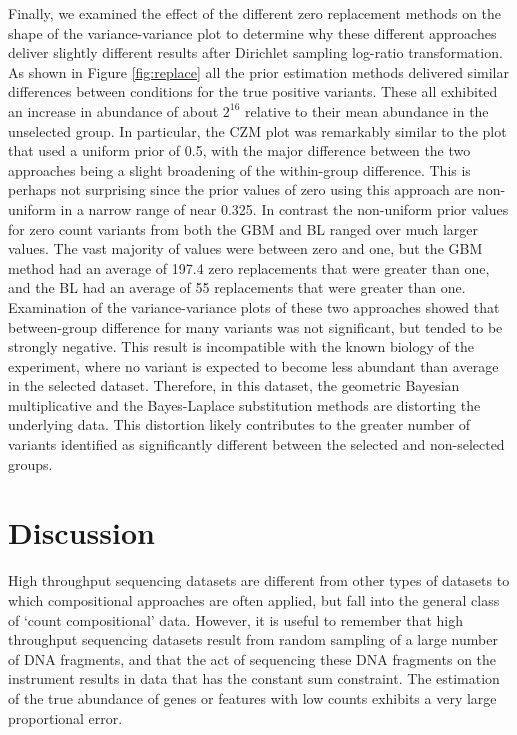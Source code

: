 \documentclass[article]{ajs}\usepackage[]{graphicx}\usepackage[]{color}
\begin{document}
Finally, we examined the effect of the different zero replacement methods on the shape of the variance-variance plot to determine why these different approaches deliver slightly different results after Dirichlet sampling log-ratio transformation. As shown in Figure \ref{fig:replace} all the prior estimation methods delivered similar differences between conditions for the true positive variants. These all exhibited an increase in abundance of about $2^{16}$ relative to their mean abundance in the unselected group. In particular, the CZM plot was remarkably similar  to the plot that used a uniform prior of 0.5, with the major difference between the two approaches being a slight broadening of the within-group difference. This is perhaps not surprising since the prior values of zero using this approach are non-uniform in a narrow range of near 0.325. In contrast the non-uniform prior values for zero count variants from both the GBM and BL ranged over much larger values. The vast majority of values were between zero and one, but the GBM method had an average of 197.4 zero replacements that were greater than one, and the BL had an average of 55 replacements that were greater than one. Examination of the variance-variance plots of these two approaches showed that between-group difference for many variants was not significant, but tended to be strongly negative. This result is incompatible with the known biology of the experiment, where no variant is expected to become less abundant than average in the selected dataset. Therefore, in this dataset, the geometric Bayesian multiplicative and the Bayes-Laplace substitution methods are distorting the underlying data. This distortion likely contributes to the greater number of variants identified as significantly different between the selected and non-selected groups.  

\section{Discussion}
\vskip-0.25cm 

High throughput sequencing datasets are  different from other types of datasets to which compositional approaches are often applied, but fall into the general class of `count compositional' data. However, it is useful to remember that high throughput sequencing datasets result from random sampling of a large number of DNA fragments, and that the act of sequencing these DNA fragments on the instrument results in data that has the constant sum constraint. The estimation of the true abundance of genes or features with low counts exhibits a very large proportional error.  
\end{document}
